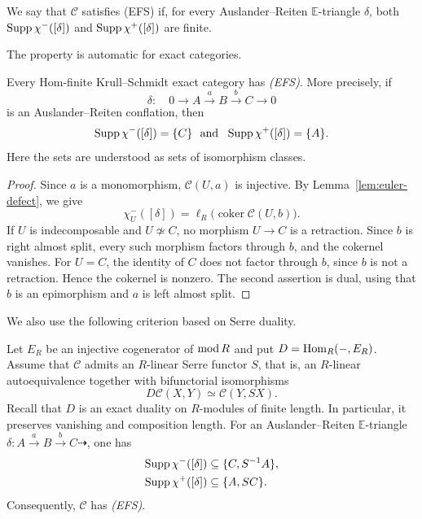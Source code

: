 \documentclass[11pt, twoside]{article}
\def\C{\mathcal{C}}
\def\E{\mathbb{E}}
\numberwithin{equation}{section}
\newcommand{\coker}{\operatorname{coker}}
\begin{document}
\begin{definition}\label{def:EFS}
We say that $\C$ satisfies {(EFS)} if, for every Auslander--Reiten
$\E$-triangle $\delta$, both $\operatorname{Supp}\chi^-([\delta])$ and
$\operatorname{Supp}\chi^+([\delta])$ are finite.
\end{definition}

The property is automatic for exact categories.

\begin{proposition}\label{prop:exact-EFS}
Every Hom-finite Krull--Schmidt exact category has \emph{(EFS)}.  More
precisely, if
\[
 \delta:\quad 0\longrightarrow A\xrightarrow{~a~}B
 \xrightarrow{~b~}C\longrightarrow0
\]
is an Auslander--Reiten conflation, then
\[
 \operatorname{Supp}\chi^-([\delta])=\{C\}~~\mbox{and}~~
 \operatorname{Supp}\chi^+([\delta])=\{A\}.
\]
Here the sets are understood as sets of isomorphism classes.
\end{proposition}

\begin{proof}
Since $a$ is a monomorphism, $\C(U,a)$ is injective.
By Lemma~\ref{lem:euler-defect}, we give
\[
 \chi_U^-([\delta])=\ell_R\bigl(\coker\C(U,b)\bigr).
\]
If $U$ is indecomposable and $U\not\simeq C$, no morphism $U\to C$ is a
retraction.  Since $b$ is right almost split, every such morphism factors
through $b$, and the cokernel vanishes.  For $U=C$, the identity of $C$ does
not factor through $b$, since $b$ is not a retraction.  Hence the cokernel is
nonzero.  The second assertion is dual, using that $b$ is an epimorphism and
$a$ is left almost split.
\end{proof}

We also use the following criterion based on Serre duality.

\begin{proposition}\label{prop:Serre-EFS}
Let $E_R$ be an injective cogenerator of $\operatorname{mod} R$ and put
$D={\rm Hom}_R(-,E_R)$.  Assume that $\C$ admits an $R$-linear Serre functor $S$,
that is, an $R$-linear autoequivalence together with bifunctorial
isomorphisms
\[
 D\C(X,Y)\simeq\C(Y,SX).
\]
Recall that $D$ is an exact duality on $R$-modules of finite length. In
particular, it preserves vanishing and composition length.
For an Auslander--Reiten $\E$-triangle
$\delta\colon A\xrightarrow{a}B\xrightarrow{b}C\dashrightarrow$, one has
\begin{align*}
 \operatorname{Supp}\chi^-([\delta])&\subseteq\{C,S^{-1}A\},\\
 \operatorname{Supp}\chi^+([\delta])&\subseteq\{A,SC\}.
\end{align*}
Consequently, $\C$ has \emph{(EFS)}.
\end{proposition}
\end{document}
